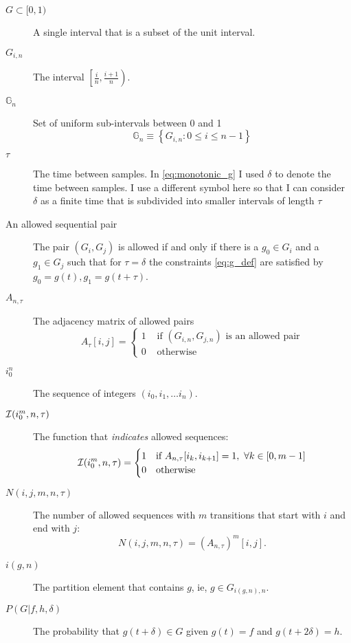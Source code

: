 \documentclass[12pt]{article} \usepackage{amsmath,amsfonts}
\newcommand{\field}[1]{\mathbb{#1}}
\newcommand\G{\field{G}}
\newcommand\I{{\cal I}}
\begin{document}
\begin{description}
\item[$G \subset [0,1)$] A single interval that is a subset of the
  unit interval.
\item[$G_{i,n}$] The interval $\left[ \frac{i}{n}, \frac{i+1}{n}
  \right)$.
\item[$\G_n$] Set of uniform sub-intervals between 0 and 1
  \begin{equation*}
    \G_n \equiv \left\{ G_{i,n} : 0 \leq i \leq n-1 \right\}
  \end{equation*}
\item[$\tau$] The time between samples.  In \eqref{eq:monotonic_g} I
  used $\delta$ to denote the time between samples.  I use a different
  symbol here so that I can consider $\delta$ as a finite time that is
  subdivided into smaller intervals of length $\tau$
\item[An allowed sequential pair] The pair $(G_i, G_j)$ is allowed if
  and only if there is a $g_0\in G_i$ and a $g_1 \in G_j$ such that
  for $\tau=\delta$ the constraints \eqref{eq:g_def} are satisfied by
  $g_0=g(t), g_1=g(t+\tau)$.
\item[$A_{n,\tau}$] The adjacency matrix of allowed pairs
  \begin{equation*}
    A_\tau[i,j] =
    \begin{cases}
      1 &\text{ if } (G_{i,n}, G_{j,n}) \text{ is an allowed pair}\\
      0 &\text{ otherwise}
    \end{cases}
  \end{equation*}
\item[$i_0^n$] The sequence of integers $\left( i_0, i_1, \ldots i_n
  \right)$.
\item[$\I(i_0^m,n,\tau)$] The function that \emph{indicates} allowed
  sequences:
  \begin{equation*}
    \I(i_0^m,n,\tau) =
    \begin{cases}
      1 & \text{if }A_{n,\tau}[i_k,i_{k+1}] = 1,~ \forall k \in [0,m-1]\\
      0 & \text{otherwise}
    \end{cases}
  \end{equation*}
\item[$N(i,j,m,n,\tau)$] The number of allowed sequences with $m$
  transitions that start with $i$ and end with $j$:
  \begin{equation*}
    N(i,j,m,n,\tau) = \left( A_{n,\tau} \right)^m[i,j].
  \end{equation*}
\item[$i(g,n)$] The partition element that contains $g$, ie,
  $g \in G_{i(g,n),n}$.
\item[$P(G|f,h, \delta)$] The probability that $g(t+\delta) \in G$
  given $g(t)=f$ and $g(t+2\delta)=h$.
\end{description}
\end{document}
